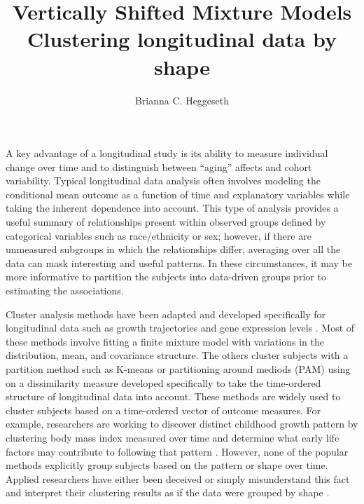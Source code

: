 \documentclass[12pt]{article}
\title{Vertically Shifted Mixture Models \\ Clustering longitudinal data by shape}
\author{Brianna C. Heggeseth}
\begin{document}
\maketitle

A key advantage of a longitudinal study is its ability to measure individual change over time and to distinguish between ``aging'' affects and cohort variability. Typical longitudinal data analysis often involves modeling the conditional mean outcome as a function of time and explanatory variables while taking the inherent dependence into account. This type of analysis provides a useful summary of relationships present within observed groups defined by categorical variables such as race/ethnicity or sex; however, if there are unmeasured subgroups in which the relationships differ, averaging over all the data can mask interesting and useful patterns. In these circumstances, it may be more informative to partition the subjects into data-driven groups prior to estimating the associations.

Cluster analysis methods have been adapted and developed specifically for longitudinal data such as growth trajectories and gene expression levels \cite{schneiderman1993,genolini2010, jones2001, muthen2010, mcnicholas2010}. Most of these methods involve fitting a finite mixture model with variations in the distribution, mean, and covariance structure. The others cluster subjects with a partition method such as K-means \cite{macqueen1967,hartigan1979,} or partitioning around mediods (PAM) \cite{kaufman1990} using on a dissimilarity measure developed specifically to take the time-ordered structure of longitudinal data into account. These methods are widely used to cluster subjects based on a time-ordered vector of outcome measures. For example, researchers are working to discover distinct childhood growth pattern by clustering body mass index measured over time and determine what early life factors may contribute to following that pattern \cite{pryor2011,carter2012}. However, none of the popular methods explicitly group subjects based on the pattern or shape over time. Applied researchers have either been deceived or simply misunderstand this fact and interpret their clustering results as if the data were grouped by shape \cite{pryor2011,carter2012,nagin1999}. 
\end{document}
